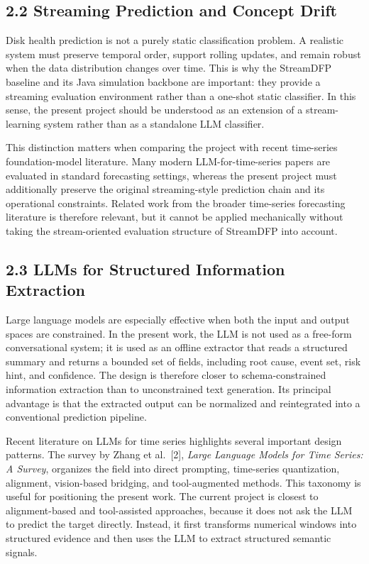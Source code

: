 \documentclass[
  11pt,
  a4paper]{article}
\begin{document}
\hypertarget{streaming-prediction-and-concept-drift}{%
\subsection{2.2 Streaming Prediction and Concept
Drift}\label{streaming-prediction-and-concept-drift}}

Disk health prediction is not a purely static classification problem. A
realistic system must preserve temporal order, support rolling updates,
and remain robust when the data distribution changes over time. This is
why the StreamDFP baseline and its Java simulation backbone are
important: they provide a streaming evaluation environment rather than a
one-shot static classifier. In this sense, the present project should be
understood as an extension of a stream-learning system rather than as a
standalone LLM classifier.

This distinction matters when comparing the project with recent
time-series foundation-model literature. Many modern LLM-for-time-series
papers are evaluated in standard forecasting settings, whereas the
present project must additionally preserve the original streaming-style
prediction chain and its operational constraints. Related work from the
broader time-series forecasting literature is therefore relevant, but it
cannot be applied mechanically without taking the stream-oriented
evaluation structure of StreamDFP into account.

\hypertarget{llms-for-structured-information-extraction}{%
\subsection{2.3 LLMs for Structured Information
Extraction}\label{llms-for-structured-information-extraction}}

Large language models are especially effective when both the input and
output spaces are constrained. In the present work, the LLM is not used
as a free-form conversational system; it is used as an offline extractor
that reads a structured summary and returns a bounded set of fields,
including root cause, event set, risk hint, and confidence. The design
is therefore closer to schema-constrained information extraction than to
unconstrained text generation. Its principal advantage is that the
extracted output can be normalized and reintegrated into a conventional
prediction pipeline.

Recent literature on LLMs for time series highlights several important
design patterns. The survey by Zhang et al.~{[}2{]}, \emph{Large
Language Models for Time Series: A Survey}, organizes the field into
direct prompting, time-series quantization, alignment, vision-based
bridging, and tool-augmented methods. This taxonomy is useful for
positioning the present work. The current project is closest to
alignment-based and tool-assisted approaches, because it does not ask
the LLM to predict the target directly. Instead, it first transforms
numerical windows into structured evidence and then uses the LLM to
extract structured semantic signals.
\end{document}
